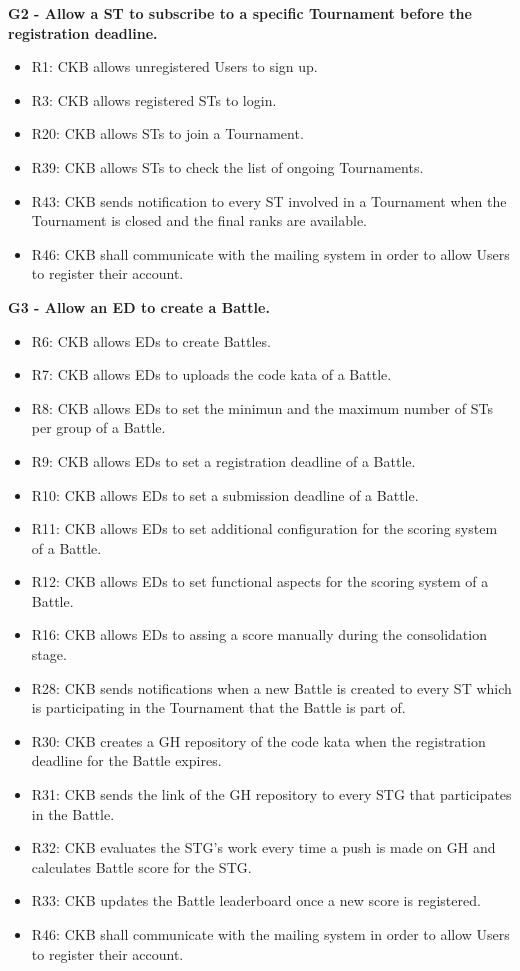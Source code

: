 \vspace{1.5cm}
\textbf{G2 - Allow a ST to subscribe to a specific Tournament before the registration deadline.}\\
\begin{itemize}
    \item R1: CKB allows unregistered Users to sign up.
    \item R3: CKB allows registered STs to login.
    \item R20: CKB allows STs to join a Tournament.
    \item R39: CKB allows STs to check the list of ongoing Tournaments.
    \item R43: CKB sends notification to every ST involved in a Tournament when the Tournament is closed and the final ranks are available.
    \item R46: CKB shall communicate with the mailing system in order to allow Users to register their account.
\end{itemize}


\vspace{1.5cm}
\textbf{G3 - Allow an ED to create a Battle.}\\
\begin{itemize}
    \item R6: CKB allows EDs to create Battles.
    \item R7: CKB allows EDs to uploads the code kata of a Battle.
    \item R8: CKB allows EDs to set the minimun and the maximum number of STs per group of a Battle.
    \item R9: CKB allows EDs to set a registration deadline of a Battle.
    \item R10: CKB allows EDs to set a submission deadline of a Battle.
    \item R11: CKB allows EDs to set additional configuration for the scoring system of a Battle.
    \item R12: CKB allows EDs to set functional aspects for the scoring system of a Battle.
    \item R16: CKB allows EDs to assing a score manually during the consolidation stage.
    \item R28: CKB sends notifications when a new Battle is created to every ST which is participating in the Tournament that the Battle is part of.
    \item R30: CKB creates a GH repository of the code kata when the registration deadline for the Battle expires.
    \item R31: CKB sends the link of the GH repository to every STG that participates in the Battle.
    \item R32: CKB evaluates the STG's work every time a push is made on GH and calculates Battle score for the STG.
    \item R33: CKB updates the Battle leaderboard once a new score is registered.
    \item R46: CKB shall communicate with the mailing system in order to allow Users to register their account.
\end{itemize}


